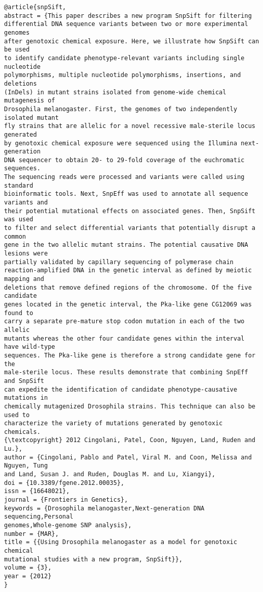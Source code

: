 \documentclass[]{article}
\begin{document}
\begin{verbatim}
@article{snpSift,
abstract = {This paper describes a new program SnpSift for filtering
differential DNA sequence variants between two or more experimental genomes
after genotoxic chemical exposure. Here, we illustrate how SnpSift can be used
to identify candidate phenotype-relevant variants including single nucleotide
polymorphisms, multiple nucleotide polymorphisms, insertions, and deletions
(InDels) in mutant strains isolated from genome-wide chemical mutagenesis of
Drosophila melanogaster. First, the genomes of two independently isolated mutant
fly strains that are allelic for a novel recessive male-sterile locus generated
by genotoxic chemical exposure were sequenced using the Illumina next-generation
DNA sequencer to obtain 20- to 29-fold coverage of the euchromatic sequences.
The sequencing reads were processed and variants were called using standard
bioinformatic tools. Next, SnpEff was used to annotate all sequence variants and
their potential mutational effects on associated genes. Then, SnpSift was used
to filter and select differential variants that potentially disrupt a common
gene in the two allelic mutant strains. The potential causative DNA lesions were
partially validated by capillary sequencing of polymerase chain
reaction-amplified DNA in the genetic interval as defined by meiotic mapping and
deletions that remove defined regions of the chromosome. Of the five candidate
genes located in the genetic interval, the Pka-like gene CG12069 was found to
carry a separate pre-mature stop codon mutation in each of the two allelic
mutants whereas the other four candidate genes within the interval have wild-type
sequences. The Pka-like gene is therefore a strong candidate gene for the
male-sterile locus. These results demonstrate that combining SnpEff and SnpSift
can expedite the identification of candidate phenotype-causative mutations in
chemically mutagenized Drosophila strains. This technique can also be used to
characterize the variety of mutations generated by genotoxic chemicals.
{\textcopyright} 2012 Cingolani, Patel, Coon, Nguyen, Land, Ruden and Lu.},
author = {Cingolani, Pablo and Patel, Viral M. and Coon, Melissa and Nguyen, Tung
and Land, Susan J. and Ruden, Douglas M. and Lu, Xiangyi},
doi = {10.3389/fgene.2012.00035},
issn = {16648021},
journal = {Frontiers in Genetics},
keywords = {Drosophila melanogaster,Next-generation DNA sequencing,Personal
genomes,Whole-genome SNP analysis},
number = {MAR},
title = {{Using Drosophila melanogaster as a model for genotoxic chemical
mutational studies with a new program, SnpSift}},
volume = {3},
year = {2012}
}
\end{verbatim}
\end{document}
